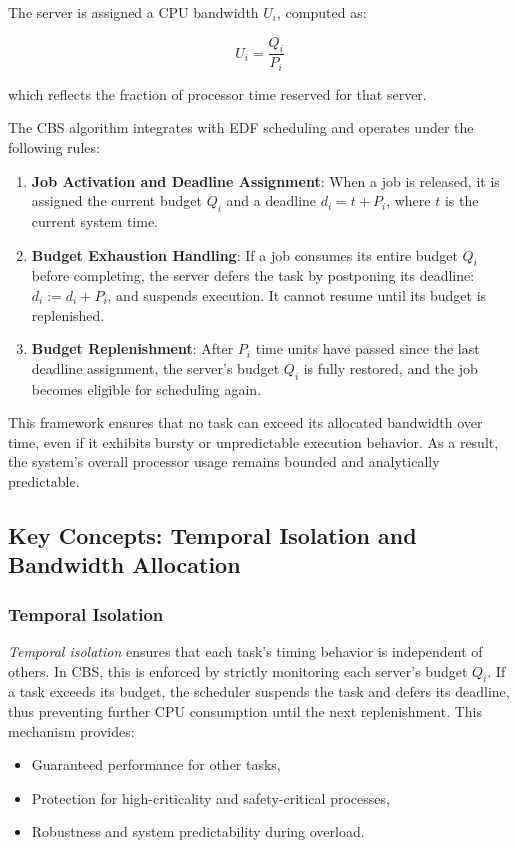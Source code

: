 \documentclass[conference]{IEEEtran}
\begin{document}
The server is assigned a CPU bandwidth \( U_i \), computed as:

\[
U_i = \frac{Q_i}{P_i}
\]

which reflects the fraction of processor time reserved for that server.

The CBS algorithm integrates with EDF scheduling and operates under the following rules:

\begin{enumerate}
    \item \textbf{Job Activation and Deadline Assignment}: When a job is released, it is assigned the current budget \( Q_i \) and a deadline \( d_i = t + P_i \), where \( t \) is the current system time.
    \item \textbf{Budget Exhaustion Handling}: If a job consumes its entire budget \( Q_i \) before completing, the server defers the task by postponing its deadline: \( d_i := d_i + P_i \), and suspends execution. It cannot resume until its budget is replenished.
    \item \textbf{Budget Replenishment}: After \( P_i \) time units have passed since the last deadline assignment, the server's budget \( Q_i \) is fully restored, and the job becomes eligible for scheduling again.
\end{enumerate}

This framework ensures that no task can exceed its allocated bandwidth over time, even if it exhibits bursty or unpredictable execution behavior. As a result, the system’s overall processor usage remains bounded and analytically predictable.

\subsection{Key Concepts: Temporal Isolation and Bandwidth Allocation}

\subsubsection{Temporal Isolation}

\textit{Temporal isolation} ensures that each task’s timing behavior is independent of others. In CBS, this is enforced by strictly monitoring each server’s budget \( Q_i \). If a task exceeds its budget, the scheduler suspends the task and defers its deadline, thus preventing further CPU consumption until the next replenishment. This mechanism provides:

\begin{itemize}
    \item Guaranteed performance for other tasks,
    \item Protection for high-criticality and safety-critical processes,
    \item Robustness and system predictability during overload.
\end{itemize}
\end{document}
